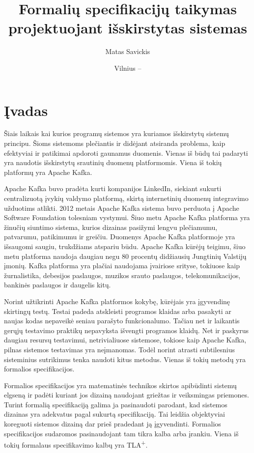 \documentclass{VUMIFPSmagistrinis}
\title{Formalių specifikacijų taikymas projektuojant išskirstytas sistemas}
\author{Matas Savickis}
\date{Vilnius – \the\year}
\begin{document}
\maketitle

\tableofcontents

	\section{Įvadas}

		Šiais laikais kai kurios programų sistemos yra kuriamos išskirstytų sistemų principu\cite{mcr}.
		Šioms sistemoms plečiantis ir didėjant atsiranda problema, kaip efektyviai ir patikimai apdoroti gaunamus duomenis.
		Vienas iš būdų tai padaryti yra naudotis išskirstytų srautinių duomenų platformomis.
		Viena iš tokių platformų yra Apache Kafka.


 		Apache Kafka buvo pradėta kurti kompanijos LinkedIn, siekiant sukurti centralizuotą įvykių valdymo platformą, skirtą internetinių duomenų integravimo užduotims atlikti.
		2012 metais Apache Kafka sistema buvo perduota į Apache Software Foundation tolesniam vystymui.
		Šiuo metu Apache Kafka platforma yra žinučių siuntimo sistema, kurios dizainas pasižymi lengvu plečiamumu, patvarumu, patikimumu ir greičiu.
		Duomenys Apache Kafka platformoje yra išsaugomi saugiu, trukdžiams atspariu būdu.
		Apache Kafka kūrėjų teigimu, šiuo metu platforma naudoja daugiau negu 80 procentų didžiausių Jungtinių Valstijų įmonių.
		Kafka platforma yra plačiai naudojama įvairiose srityse, tokiuose kaip žurnalistika, debesijos paslaugos, muzikos srauto paslaugos, telekomunikacijos, bankinės paslaugos ir daugelis kitų.


		Norint užtikrinti Apache Kafka platformos kokybę, kūrėjais yra įgyvendinę skirtingų testų.
		Testai padeda atskleisti programos klaidas arba pasakyti ar naujas kodas nepaveikė seniau parašyto funkcionalumo.
		Tačiau net ir laikantis gerųjų testavimo praktikų nepavyksta išvengti programos klaidų.
		Net ir paskyrus daugiau resursų testavimui, netrivialiuose sistemose, tokiose kaip Apache Kafka, pilnas sistemos testavimas yra neįmanomas.
		Todėl norint atrasti subtilesnius sisteminius sutrikimus tenka naudoti kitus metodus.
		Vienas iš tokių metodų yra formalios specifikacijos.


		Formalios specifikacijos yra matematinės technikos skirtos apibūdinti sistemų elgseną ir padėti kuriant jos dizainą naudojant griežtas ir veiksmingas priemones.
		Turint formalią specifikaciją galima ja pasinaudoti parodant, kad sistemos dizainas yra adekvatus pagal sukurtą specifikaciją.
		Tai leidžia objektyviai koreguoti sistemos dizainą dar prieš pradedant ją įgyvendinti.
		Formalios specifikacijos sudaromos pasinaudojant tam tikra kalba arba įrankiu.
		Viena iš tokių formalaus specifikavimo kalbų yra TLA\textsuperscript{+}.
		
\end{document}
